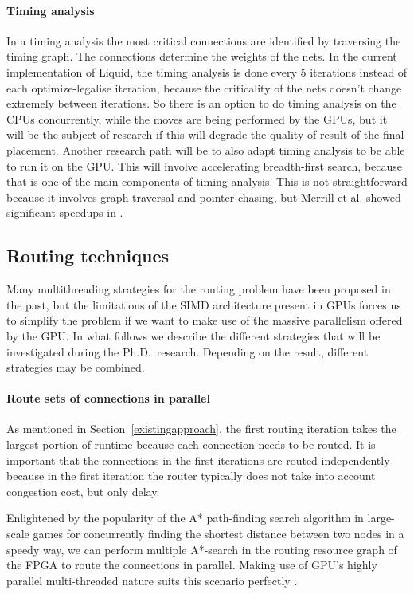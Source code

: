 \documentclass[a4paper,oneside,12pt]{article}
\begin{document}
\paragraph{Timing analysis}
In a timing analysis the most critical connections are identified by traversing the timing graph. The connections determine the weights of the nets.
In the current implementation of {\sc Liquid}, the timing analysis is done every 5 iterations instead of each optimize-legalise iteration, because the criticality of the nets doesn't change extremely between iterations.
So there is an option to do timing analysis on the CPUs concurrently, while the moves are being performed by the GPUs, but it will be the subject of research if this will degrade the quality of result of the final placement.
Another research path will be to also adapt timing analysis to be able to run it on the GPU. This will involve accelerating breadth-first search, because that is one of the main components of timing analysis. This is not straightforward because it involves graph traversal and pointer chasing, but Merrill et al. showed significant speedups in \cite{Merrill2015}.



\subsection{Routing techniques}\label{routetech}

Many multithreading strategies for the routing problem have been proposed in the past, but the limitations of the SIMD architecture present in GPUs forces us to simplify the problem if we want to make use of the massive parallelism offered by the GPU.
In what follows we describe the different strategies that will be investigated during the Ph.D.\ research. Depending on the result, different strategies may be combined.

\paragraph{Route sets of connections in parallel}
As mentioned in Section~\ref{existingapproach}, the first routing iteration takes the largest portion of runtime because each connection needs to be routed.
It is important that the connections in the first iterations are routed independently because in the first iteration the router typically does not take into account congestion cost, but only delay.

Enlightened by the popularity of the A* path-finding search algorithm in large-scale games for concurrently finding the shortest distance between two nodes in a speedy way, we can perform multiple A*-search in the routing resource graph of the FPGA to route the connections in parallel. Making use of GPU's highly parallel multi-threaded nature suits this scenario perfectly \cite{bleiweiss2008gpu,bleiweiss2012system}.
\end{document}
